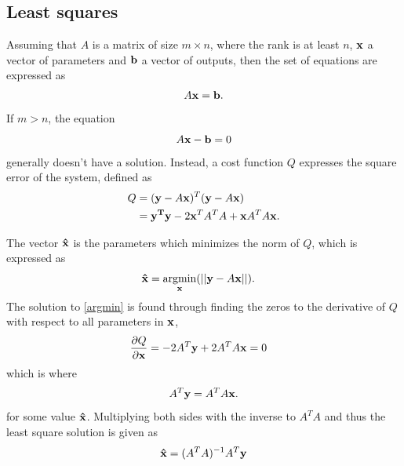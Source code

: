 
\chapter{}
\section{Least squares}\label{ch:LS}
Assuming that $A$ is a matrix of size $m\times n$, where the rank is at least $n$, $\bf x$ a vector of parameters and $\bf b$ a vector of outputs, then the set of equations are expressed as
\begin{align}
A{\bf x}={\bf b}. \nonumber
\end{align}
If $m>n$, the equation 
\begin{equation}
A{\bf x}-{\bf b}=0 \nonumber
\end{equation}
generally doesn't have a solution. Instead, a cost function $Q$ expresses the square error of the system, defined as 
\begin{align}
Q 	&=({\bf y}-A{\bf x})^T({\bf y}-A{\bf x})\\
	&={\bf y^Ty}-2{\bf x}^TA^TA+{\bf x}A^TA{\bf x}.
\end{align}

The vector ${\bf \hat{x}}$ is the parameters which minimizes the norm of $Q$, which is expressed as
\begin{align}\label{argmin}
		{\bf \hat{x}}&=\operatorname*{argmin}_{\bf x}(||{\bf y}-A{\bf x}||). 
\end{align}
The solution to \ref{argmin} is found through finding the zeros to the derivative of $Q$ with respect to all parameters in $\bf x$, 
\begin{align*}
\frac{\partial Q}{\partial {\bf x}}&=-2A^T{\bf y}+2A^TA{\bf x}=0
\end{align*}	
which is where 
\begin{equation}
A^T{\bf y}=A^TA{\bf \bf{x}}.
\end{equation}
for some value $\bf \hat{x}$. Multiplying both sides with the inverse to $A^TA$ and thus the least square solution is given as
\begin{align}		
	{\bf \hat{x}}=(A^TA)^{-1}A^T{\bf y} \label{LS_theory}\\
\end{align}
